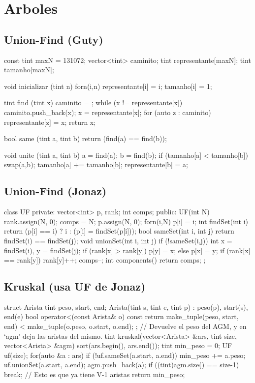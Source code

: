 \section{Arboles}

\subsection{Union-Find (Guty)}
\begin{code}
const tint maxN = 131072;
vector<tint> caminito;
tint representante[maxN];
tint tamanho[maxN];

void inicializar (tint n) {
	forn(i,n) {
		representante[i] = i;
		tamanho[i] = 1;
	}
}

tint find (tint x) {
	caminito = {};
	while (x != representante[x]) {
		caminito.push_back(x);
		x = representante[x];	
	}
	for (auto z : caminito)
		representante[z] = x;
	return x;
}

bool same (tint a, tint b) { return (find(a) == find(b)); }

void unite (tint a, tint b) {
	a = find(a);
	b = find(b);
	if (tamanho[a] < tamanho[b])
		swap(a,b);
	tamanho[a] += tamanho[b];
	representante[b] = a;	
}
\end{code}

\subsection{Union-Find (Jonaz)}
\begin{code}
class UF {
private: vector<int> p, rank; int comps;
public: 
  UF(int N) {
    rank.assign(N, 0); comps = N;
    p.assign(N, 0); forn(i,N) p[i] = i;
  }
  int findSet(int i) { return (p[i] == i) ? i : (p[i] = findSet(p[i])); }
  bool sameSet(int i, int j) { return findSet(i) == findSet(j); }
  void unionSet(int i, int j) {
    if (!sameSet(i,j)) {
      int x = findSet(i), y = findSet(j);
      if (rank[x] > rank[y]) p[y] = x;
      else { 
        p[x] = y; 
        if (rank[x] == rank[y]) rank[y]++;
      }
      comps--;
    }
  }
  int components() { return comps; }
};
\end{code}

\subsection{Kruskal (usa UF de Jonaz)}
\begin{code}
struct Arista {
  tint peso, start, end;
  Arista(tint s, tint e, tint p) : peso(p), start(s), end(e) {}
  bool operator<(const Arista& o) const {
    return make_tuple(peso, start, end) < make_tuple(o.peso, o.start, o.end);
}};
// Devuelve el peso del AGM, y en `agm' deja las aristas del mismo. 
tint kruskal(vector<Arista> &ars, tint size, vector<Arista> &agm) {
  sort(ars.begin(), ars.end());
  tint min_peso = 0;
  UF uf(size);
  for(auto &a : ars) {
    if (!uf.sameSet(a.start, a.end)) {
      min_peso += a.peso;
      uf.unionSet(a.start, a.end);
      agm.push_back(a);
      if ((tint)agm.size() == size-1) break; // Esto es que ya tiene V-1 aristas
  }}
  return min_peso;
}
\end{code}

